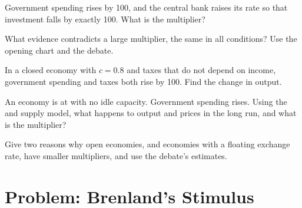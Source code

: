 \begin{exercise}[$\star\star$]\label{exo:g12:keynesian-cross:11}
Government spending rises by 100, and the central bank raises its rate so that investment falls by exactly 100. What is the multiplier?
\end{exercise}

\begin{exercise}[$\star\star\star$]\label{exo:g12:keynesian-cross:12}
What evidence contradicts a large multiplier, the same in all conditions? Use the opening chart and the debate.
\end{exercise}

\begin{exercise}[$\star\star\star$]\label{exo:g12:keynesian-cross:13}
In a closed economy with $c = 0.8$ and taxes that do not depend on income, government spending and taxes both rise by 100. Find the change in output.
\end{exercise}

\begin{exercise}[$\star\star\star$]\label{exo:g12:keynesian-cross:14}
An economy is at  with no idle capacity. Government spending rises. Using the  and supply model, what happens to output and prices in the
long run, and what is the multiplier?
\end{exercise}

\begin{exercise}[$\star\star\star$]\label{exo:g12:keynesian-cross:15}
Give two reasons why open economies, and economies with a floating exchange rate, have smaller multipliers, and use the debate's estimates.
\end{exercise}

\section{Problem: Brenland's Stimulus}

